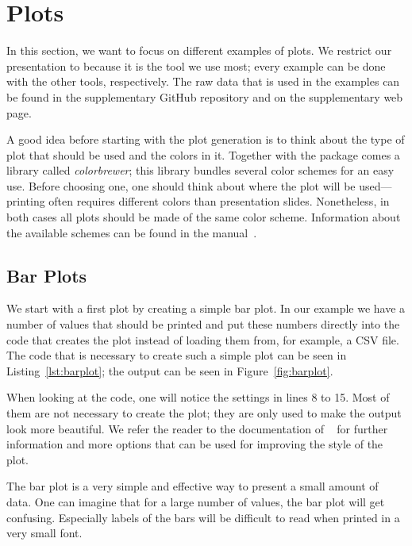 \section{Plots}

In this section, we want to focus on different examples of plots.  We restrict
our presentation to  because it is the tool we use most;
every example can be done with the other tools, respectively.  The raw data that
is used in the examples can be found in the supplementary GitHub
repository and on the supplementary web
page.

A good idea before starting with the plot generation is to think about the type
of plot that should be used and the colors in it.  Together with the
 package comes a library called \emph{colorbrewer}; this
library bundles several color schemes for an easy use.  Before choosing one,
one should think about where the plot will be used—printing often requires
different colors than presentation slides.  Nonetheless, in both cases all plots
should be made of the same color scheme.  Information about the available
schemes can be found in the 
manual~\cite[Sect.~5.2]{Feuersaenger2016}.

\subsection{Bar Plots}

We start with a first plot by creating a simple bar plot.  In our example we
have a number of values that should be printed and put these numbers directly
into the code that creates the plot instead of loading them from, for example, a
CSV file.  The code that is necessary to create such a simple plot can be seen
in Listing~\ref{lst:barplot}; the output can be seen in
Figure~\ref{fig:barplot}.

When looking at the code, one will notice the settings in lines 8 to 15.  Most
of them are not necessary to create the plot; they are only used to make the
output look more beautiful.  We refer the reader to the documentation of
~\cite{Feuersaenger2016} for further information and more
options that can be used for improving the style of the plot.

The bar plot is a very simple and effective way to present a small amount of
data.  One can imagine that for a large number of values, the bar plot will get
confusing.  Especially labels of the bars will be difficult to read when printed
in a very small font.

